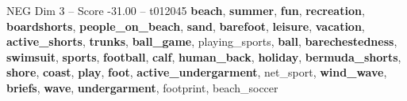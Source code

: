 \begin{textsample}{NEG Dim 3 – Score -31.00 – t012045}  \label{ex:f3_neg_002}
\textbf{beach}, \textbf{summer}, \textbf{fun}, \textbf{recreation}, \textbf{boardshorts}, \textbf{people\_on\_beach}, \textbf{sand}, \textbf{barefoot}, \textbf{leisure}, \textbf{vacation}, \textbf{active\_shorts}, \textbf{trunks}, \textbf{ball\_game}, playing\_sports, \textbf{ball}, \textbf{barechestedness}, \textbf{swimsuit}, \textbf{sports}, \textbf{football}, \textbf{calf}, \textbf{human\_back}, \textbf{holiday}, \textbf{bermuda\_shorts}, \textbf{shore}, \textbf{coast}, \textbf{play}, \textbf{foot}, \textbf{active\_undergarment}, net\_sport, \textbf{wind\_wave}, \textbf{briefs}, \textbf{wave}, \textbf{undergarment}, footprint, beach\_soccer

\end{textsample}

